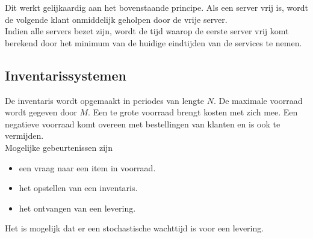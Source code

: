 \documentclass{article}
\begin{document}
	Dit werkt gelijkaardig aan het bovenstaande principe. Als een server vrij is, wordt de volgende klant onmiddelijk geholpen door de vrije server.\\
	
	Indien alle servers bezet zijn, wordt de tijd waarop de eerste server vrij komt berekend door het minimum van de huidige eindtijden van de services te nemen.
	

	
	\subsection{Inventarissystemen}
	
	De inventaris wordt opgemaakt in periodes van lengte $N$. De maximale voorraad wordt gegeven door $M$. Een te grote voorraad brengt kosten met zich mee. Een negatieve voorraad komt overeen met bestellingen van klanten en is ook te vermijden.\\
	
	Mogelijke gebeurtenissen zijn
	\begin{itemize}
		\item een vraag naar een item in voorraad.
		\item het opstellen van een inventaris.
		\item het ontvangen van een levering.
	\end{itemize}

	Het is mogelijk dat er een stochastische wachttijd is voor een levering.
\end{document}
